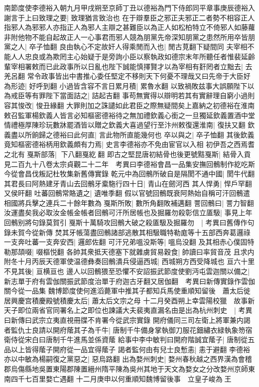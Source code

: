 南節度使李德裕入朝九月甲戌朔至京師丁丑以德裕為門下侍郎同平章事庚辰德裕入謝言于上曰致理之要|{
	致理猶言致治也}
在于辯羣臣之邪正夫邪正二者勢不相容正人指邪人為邪邪人亦指正人為邪人主辯之甚難臣以為正人如松柏特立不倚邪人如藤蘿非附他物不能自起故正人一心事君而邪人競為朋黨先帝深知朋黨之患然所用卒皆朋黨之人|{
	卒子恤翻}
良由執心不定故奸人得乘閒而入也|{
	閒古莧翻下疑間同}
夫宰相不能人人忠良或為欺罔主心始疑于是旁詢小臣以察執政如德宗末年所聽任者惟裴延齡輩宰相署敕而已此政事所以日亂也陛下誠能慎擇賢才以為宰相有姧罔者立黜去|{
	去羌呂翻}
常令政事皆出中書推心委任堅定不移則天下何憂不理哉又曰先帝于大臣好為形迹|{
	好呼到翻}
小過皆含容不言日累月積|{
	累魯水翻}
以致禍敗兹事大誤願陛下以為戒臣等有罪陛下當面詰之|{
	詰起吉翻}
事苟無實得以辯明若其有實辭理自窮小過則容其悛改|{
	悛丑緣翻}
大罪則加之誅譴如此君臣之際無疑間矣上嘉納之初德裕在淮南敕召監軍楊欽義人皆言必知樞密德裕待之無加禮欽義心銜之一旦獨延欽義置酒中堂情禮極厚陳珍玩數牀罷酒皆以贈之欽義大喜過望行至汴州敕復還淮南|{
	復扶又翻}
欽義盡以所餉歸之德裕曰此何直|{
	言此物所直能幾何也}
卒以與之|{
	卒子恤翻}
其後欽義竟知樞密德裕柄用欽義頗有力焉|{
	史言李德裕亦不免由宦官以入相}
初伊吾之西焉耆之北有戛斯部落|{
	下八翻戛紇翻}
即古之堅昆唐初結骨也後更號黠戛斯|{
	結骨入貢見二百九十八卷太宗貞觀二十二年　考異曰李德裕會昌一品集安撫回鶻制作紇吃斯今從會昌伐叛記杜牧集新舊傳實錄}
乾元中為回鶻所破自是隔閡不通中國|{
	閡牛代翻}
其君長曰阿熱建牙青山去回鶻牙槖駞行四十日|{
	青山在劒河西}
其人悍勇|{
	悍戶罕翻又侯旰翻}
吐蕃回鶻常賂遺之|{
	遺唯季翻}
假以官號回鶻既衰阿熱始自稱可汗回鶻遣相國將兵擊之連兵二十餘年數為戛斯所敗|{
	數所角翻敗補邁翻}
詈回鶻曰|{
	詈力智翻}
汝運盡矣我必取汝金帳金帳者回鶻可汗所居帳也及掘羅勿殺彰信立㕎馺|{
	事見上年}
回鶻别將句錄莫賀引戛斯十萬騎攻回鶻大破之殺㕎馺及掘羅勿　|{
	考異曰舊傳作句錄未賀今從新傳}
焚其牙帳蕩盡回鶻諸部逃散其相馺職特勒庬等十五部西奔葛邏祿一支奔吐蕃一支奔安西|{
	邏郎佐翻}
可汗兄弟嗢没斯等|{
	嗢烏没翻}
及其相赤心僕固特勒那頡啜|{
	啜樞悦翻}
各帥其衆抵天德塞下就雜虜貿易穀食|{
	帥讀曰率貿音茂}
且求内附冬十月丙辰天德軍使温德彝奏回鶻潰兵侵逼西城|{
	西城朔方西受降城也}
亘六十里不見其後|{
	亘横亘也}
邊人以回鶻猥至恐懼不安詔振武節度使劉沔屯雲迦關以備之|{
	新志單于府有雲伽關振武節度治單于府迦古牙翻又居伽翻　考異曰新傳實錄作雲伽關今從一品集}
魏博節度使何進滔薨軍中推其子都知兵馬使重順知留後　蕭太后徙居興慶宫積慶殿號積慶太后|{
	蕭太后文宗之母}
十二月癸酉朔上幸雲陽校獵　故事新天子即位兩省官同署名上之即位也諫議大夫裴夷直漏名由是出為杭州刺史　|{
	考異曰新傳曰武宗立夷直視冊牒不肯署今從武宗實錄}
開府儀同三司左衛上將軍兼内謁者監仇士良請以開府䕃其子為千牛|{
	唐制千牛備身掌執御刀服花鈿繡衣緑執象笏宿衛侍從宋白曰唐制千牛進馬並係資䕃}
給事中李中敏判曰開府階誠宜䕃子|{
	唐制從五品以上皆得䕃子開府從一品宜得䕃子}
謁者監何由有兒士良慙恚|{
	恚于避翻}
李德裕亦以中敏為楊嗣復之黨惡之|{
	惡烏路翻}
出為婺州刺史|{
	婺州春秋越之西界漢為會稽郡烏傷縣地吳置東陽郡陳置縉州隋平陳為吳州其地于天文為婺女之分改婺州京師東南四千七百里婺亡遇翻}
十二月庚申以何重順知魏博留後事　立皇子峻為王

